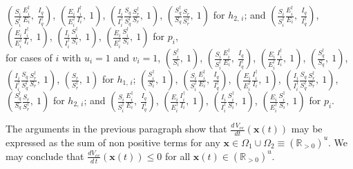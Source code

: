 \documentclass[a4paper]{article}
\newcommand{\dsum}{\displaystyle\sum}
\begin{document}
$\left(\frac{S_i}{S^\dagger _i}\frac{E_i^\dagger }{E_i},~ \frac{I_q}{I^\dagger _q}\right)$, $\left(\frac{E_i}{E^\dagger_i}\frac{I^\dagger_i}{I_i},~1\right)$, $\left(\frac{I_i}{I^\dagger _i}\frac{S_q}{S^\dagger _q} \frac{S^\dagger _r}{S_r},~1\right)$, $\left(\frac{S^\dagger _q}{S_q}\frac{S_r}{S^\dagger _r},~ 1\right)$ for $h_{2,\,i}$; and $\left( \frac{S_i}{S^\dagger _i}\frac{E^\dagger _i}{E_i},~\frac{I_q}{I^\dagger _q}\right)$, $\left(\frac{E_i}{E^\dagger _i}\frac{I^\dagger _i}{I_i},~1\right)$, $\left(\frac{I_i}{I^\dagger _i}\frac{S^\dagger _i}{S_i},~1\right)$, $\left(\frac{E_i}{E^\dagger _i}\frac{S^\dagger _i}{S_i},~1\right)$  for $p_i$, \\for cases of $i$ with $u_i=1$ and $v_i=1$,    $\left(\frac{S_i^\dagger }{S_i},~1\right)$, $\left(\frac{S_i}{S^\dagger _i}\frac{E_i^\dagger }{E_i},~ \frac{I_q}{I^\dagger _q}\right)$, $\left(\frac{E_i}{E^\dagger _i}\frac{I_i^\dagger }{I_i},~ 1\right)$, $\left(\frac{S^\dagger _q}{S_q},~ 1\right)$, $\left(\frac{I_i}{I^\dagger _i}\frac{S_q}{S^\dagger _q} \frac{S^\dagger _r}{S_r},~ 1 \right)$, $\left(\frac{S_r}{S^\dagger _r},~1\right)$  for $h_{1,\,i}$;  $\left(\frac{S_i^\dagger }{S_i},~1\right)$, $\left(\frac{S_i}{S^\dagger _i}\frac{E_i^\dagger }{E_i},~ \frac{I_q}{I^\dagger _q}\right)$, $\left(\frac{E_i}{E^\dagger_i}\frac{I^\dagger_i}{I_i},~1\right)$, $\left(\frac{I_i}{I^\dagger _i}\frac{S_q}{S^\dagger _q} \frac{S^\dagger _r}{S_r},~1\right)$, $\left(\frac{S^\dagger _q}{S_q}\frac{S_r}{S^\dagger _r},~ 1\right)$ for $h_{2,\,i}$; and $\left( \frac{S_i}{S^\dagger _i}\frac{E^\dagger _i}{E_i},~\frac{I_q}{I^\dagger _q}\right)$, $\left(\frac{E_i}{E^\dagger _i}\frac{I^\dagger _i}{I_i},~1\right)$, $\left(\frac{I_i}{I^\dagger _i}\frac{S^\dagger _i}{S_i},~1\right)$, $\left(\frac{E_i}{E^\dagger _i}\frac{S^\dagger _i}{S_i},~1\right)$  for $p_i$. 

The arguments in the previous paragraph show that  $\frac{d\,V_{ee}}{dt}(\mathbf x(t))$ may be expressed as the sum of non positive terms for any $\mathbf x\in \Omega_1\cup\Omega_2\equiv(\mathbb R_{>0})^u$. We may conclude that ${\frac{dV_{ee}}{d\,t}}(\mathbf x(t)) \leqslant 0$ for all $\mathbf x(t) \in  (\mathbb R_{>0})^u$. 
 
%
%
\end{document}
